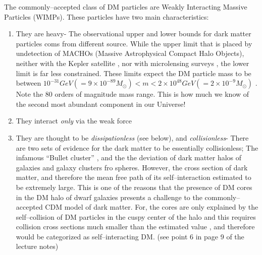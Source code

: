 \documentclass[paper=a4, fontsize=11pt]{scrartcl} %
\numberwithin{equation}{section} %
\numberwithin{figure}{section} %
\numberwithin{table}{section} %
\begin{document}
The commonly--accepted class of DM particles are Weakly Interacting Massive Particles (WIMPs). These particles have two main characteristics:
  \begin{enumerate}
  \item They are heavy- The observational upper and lower bounds for dark matter particles coms from different source. While the upper limit that is placed by undetection of MACHOs (Massive Astrophysical Compact Halo Objects), neither with the Kepler satellite \citep[41][]{Griest+2014}, nor with microlensing surveys \citep[42\&43][]{Alcock+1998, Yoo+2004}, the lower limit is far less constrained. These limits expect the DM particle mass to be between $10^\mathrm{-31} GeV (= 9\times 10^\mathrm{-89} M_\odot) < m < 2\times 10^\mathrm{48} GeV (= 2 \times 10^\mathrm{-9} M_\odot)$ \citep[47 for lower bound][ and 42 \& 43 for the upper bound]{Hu+2000, Alcock+1998, Yoo+2004}. Note the 80 orders of magnitude mass range. This is how much we know of the second most abundant component in our Universe!
  \item They interact \emph{only} via the weak force
  \item They are thought to be \emph{dissipationless} (see below), and \emph{collisionless}- There are two sets of evidence for the dark matter to be essentially collisionless; The infamous ``Bullet cluster'' \citep[17][]{Clowe+2006}, and the the deviation of dark matter halos of galaxies and galaxy clusters fro spheres. However, the cross section of dark matter, and therefore the mean free path of its self--interaction estimated to be extremely large. This is one of the reasons that the presence of DM cores in the DM halo of dwarf galaxies presents a challenge to the commonly--accepted CDM model of dark matter. For, the cores are only explained by the self--collision of DM particles in the cuspy center of the halo and this requires collision cross sections much smaller than the estimated value \citep[49][]{Zavala+2013}, and therefore would be categorized as self--interacting DM. (see point 6 in page 9 of the lecture notes)

\end{enumerate}
\end{document}
